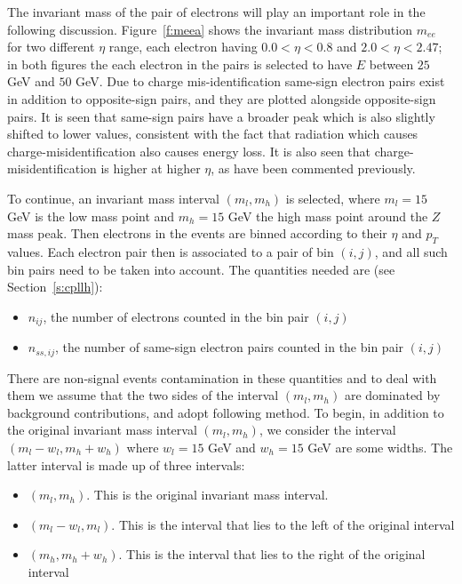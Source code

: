 The invariant mass of the pair of electrons will play an important role in the
following discussion. Figure~\ref{f:meea} \cite{atlaselcid} shows the invariant
mass distribution $m_{ee}$ for two different $\eta$ range, each electron having
$0.0 < \eta < 0.8$ and $2.0 < \eta < 2.47$; in both figures the each electron
in the pairs is selected to have $E$ between $25$ GeV and $50$ GeV. Due to
charge mis-identification same-sign electron pairs exist in addition to
opposite-sign pairs, and they are plotted alongside opposite-sign pairs. It is
seen that same-sign pairs have a broader peak which is also slightly shifted to
lower values, consistent with the fact that radiation which causes
charge-misidentification also causes energy loss. It is also seen that
charge-misidentification is higher at higher $\eta$, as have been commented
previously.

To continue, an invariant mass interval $(m_l,m_h)$ is selected, where $m_l=15$
GeV is the low mass point and $m_h=15$ GeV the high mass point around the $Z$
mass peak. Then electrons in the events are binned according to their $\eta$
and $p_T$ values. Each electron pair then is associated to a pair of bin
$(i,j)$, and all such bin pairs need to be taken into account. The quantities
needed are (see Section~\ref{s:cpllh}):

\begin{itemize}[label=]

	\item $n_{ij}$, the number of electrons counted in the bin pair $(i,j)$

	\item $n_{ss,ij}$,  the number of same-sign electron pairs counted in the bin pair $(i,j)$


\end{itemize}

There are non-signal events contamination in these quantities and to deal with
them we assume that the two sides of the interval $(m_l,m_h)$ are dominated by
background contributions, and adopt following method. To begin, in addition to
the original invariant mass interval $(m_l,m_h)$, we consider the interval
$(m_l-w_l, m_h+w_h)$ where $w_l=15$ GeV and $w_h=15$ GeV are some widths. The
latter interval is made up of three intervals:

\begin{itemize}[label=]
	\item $(m_l, m_h)$. This is the original invariant mass interval.

	\item $(m_l-w_l, m_l)$. This is the interval that lies to the left of the
	      original interval

	\item $(m_h, m_h+w_h)$. This is the interval that lies to the right of the
	      original interval


\end{itemize}

